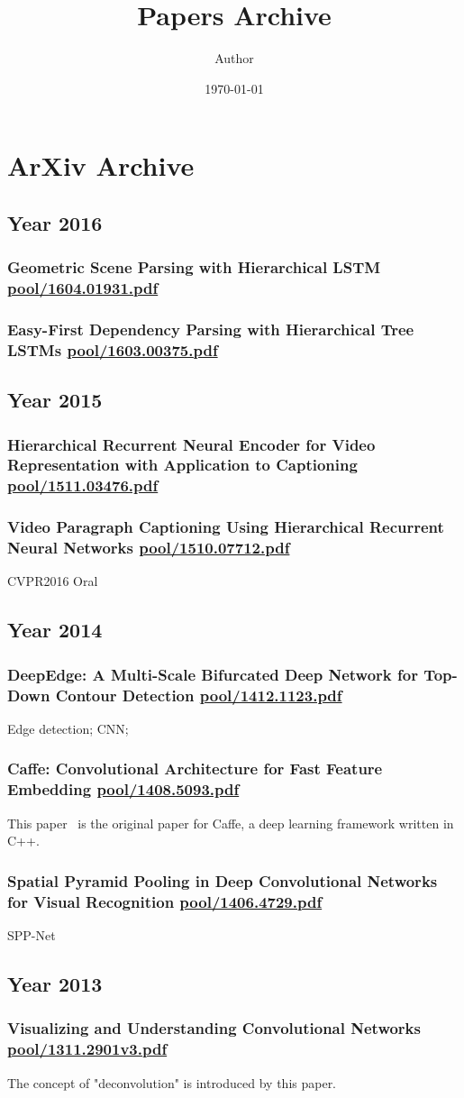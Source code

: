 \documentclass[a4paper,10pt,twocolumn]{report}
\title{Papers Archive}
\author{Author}
\date{\today}
\newcommand{\arxiv}[2]{
 \section{{#2} \href{{#1}}{#1}}
}
\begin{document}
\maketitle
\tableofcontents

\part{ArXiv Archive}

 \chapter{Year 2016}

  \arxiv{pool/1604.01931.pdf}{Geometric Scene Parsing with Hierarchical LSTM}

  \arxiv{pool/1603.00375.pdf}{Easy-First Dependency Parsing with Hierarchical Tree LSTMs}

 \chapter{Year 2015}

  \arxiv{pool/1511.03476.pdf}{Hierarchical Recurrent Neural Encoder for Video Representation with Application to Captioning}

  \arxiv{pool/1510.07712.pdf}{Video Paragraph Captioning Using Hierarchical Recurrent Neural Networks}
  CVPR2016 Oral

 \chapter{Year 2014}

  \arxiv{pool/1412.1123.pdf}{DeepEdge: A Multi-Scale Bifurcated Deep Network for Top-Down Contour Detection}
  Edge detection; CNN;

  \arxiv{pool/1408.5093.pdf}{Caffe: Convolutional Architecture for Fast Feature Embedding}
  This paper~\cite{jia2014caffe} is the original paper for Caffe, a deep learning framework written in C++.

  \arxiv{pool/1406.4729.pdf}{Spatial Pyramid Pooling in Deep Convolutional Networks for Visual Recognition}
  SPP-Net

 \chapter{Year 2013}

  \arxiv{pool/1311.2901v3.pdf}{Visualizing and Understanding Convolutional Networks}
  The concept of "deconvolution" is introduced by this paper.
\end{document}
